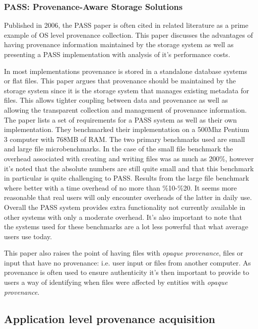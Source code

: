\subsubsection{PASS: Provenance-Aware Storage Solutions\cite{Muniswamy2006}}
\label{ssub:PASS framework}

Published in 2006, the PASS paper is often cited in related literature as a prime example of OS level provenance collection. This paper discusses the advantages of having provenance information maintained by the storage system as well as presenting a PASS implementation with analysis of it's performance costs.

In most implementations provenance is stored in a standalone database systems or flat files. This paper argues that provenance should be maintained by the storage system since it is the storage system that manages existing metadata for files. This allows tighter coupling between data and provenance as well as allowing the transparent collection and management of provenance information. The paper lists a set of requirements for a PASS system as well as their own implementation. They benchmarked their implementation on a 500Mhz Pentium 3 computer with 768MB of RAM. The two primary benchmarks used are small and large file microbenchmarks. In the case of the small file benchmark the overhead associated with creating and writing files was as much as 200\%, however it's noted that the absolute numbers are still quite small and that this benchmark in particular is quite challenging to PASS. Results from the large file benchmark where better with a time overhead of no more than \%10-\%20.  It seems more reasonable that real users will only encounter overheads of the latter in daily use. Overall the PASS system provides extra functionality not currently available in other systems with only a moderate overhead. It's also important to note that the systems used for these benchmarks are a lot less powerful that what average users use today.

This paper also raises the point of having files with \textit{opaque provenance}, files or input that have no provenance: i.e. user input or files from another computer. As provenance is often used to ensure authenticity it's then important to provide to users a way of identifying when files were affected by entities with \textit{opaque provenance}.

\subsection{Application level provenance acquisition}
\label{sub:application_level_provenance_acquisition}

